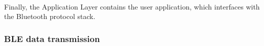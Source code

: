 
\paragraph{} Finally, the Application Layer contains the user application, which interfaces with the Bluetooth protocol stack.


\subsubsection{\acs{BLE} data transmission}

